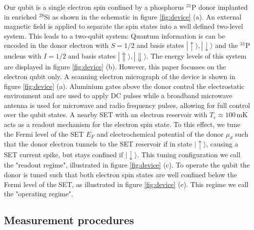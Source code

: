 \documentclass[%
 reprint,
 amsmath,amssymb,
 aps,
]{revtex4-1}
\newcommand {\ket} [1] {|{ #1 \rangle}}
\begin{document}
Our qubit is a single electron spin confined by a phosphorus $^{31}$P donor implanted in enriched $^{28}$Si as shown in the schematic in figure \ref{fig:device} (a). An external magnetic field is applied to separate the spin states into a well defined two-level system. This leads to a two-qubit system: Quantum information is can be encoded in the donor electron with $S=1/2$ and basis states $\ket{\uparrow},\ket{\downarrow}$ and the $^{31}$P nucleus with $I=1/2$ and basis states $\ket{\Uparrow},\ket{\Downarrow}$. The energy levels of this system are displayed in figure \ref{fig:device} (b).  However, this paper focusses on the electron qubit only. A scanning electron micrograph of the device is shown in figure \ref{fig:device} (a).  Aluminium gates above the donor control the electrostatic environment and are used to apply DC pulses while a broadband microwave antenna is used for microwave and radio frequency pulses, allowing for full control over the qubit states. A nearby SET with an electron reservoir with $T_e\approx 100\,$mK acts as a readout mechanism for the electron spin state. To this effect, we tune the Fermi level of the SET $E_F$ and electrochemical potential of the donor $\mu_d$ such that the donor electron tunnels to the SET reservoir if in state $\ket{\uparrow}$, causing a SET current spike, but stays confined if $\ket{\downarrow}$. This tuning configuration we call the "readout regime", illustrated in figure \ref{fig:device} (c). To operate the qubit the donor is tuned such that both electron spin states are well confined below the Fermi level of the SET, as illustrated in figure \ref{fig:device} (c). This regime we call the "operating regime". 

\subsection{\label{sec:Measurementprocedures} Measurement procedures}
\end{document}
